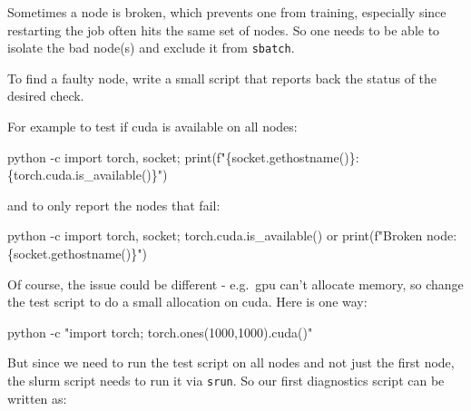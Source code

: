 \documentclass[
]{report}
\newenvironment{Shaded}{\begin{snugshade}}{\end{snugshade}}
\newcommand{\AttributeTok}[1]{\textcolor[rgb]{0.40,0.45,0.13}{#1}}
\newcommand{\ExtensionTok}[1]{\textcolor[rgb]{0.00,0.23,0.31}{#1}}
\newcommand{\NormalTok}[1]{\textcolor[rgb]{0.00,0.23,0.31}{#1}}
\newcommand{\StringTok}[1]{\textcolor[rgb]{0.13,0.47,0.30}{#1}}
\newcommand{\VariableTok}[1]{\textcolor[rgb]{0.07,0.07,0.07}{#1}}
\begin{document}
Sometimes a node is broken, which prevents one from training, especially
since restarting the job often hits the same set of nodes. So one needs
to be able to isolate the bad node(s) and exclude it from
\texttt{sbatch}.

To find a faulty node, write a small script that reports back the status
of the desired check.

For example to test if cuda is available on all nodes:

\begin{Shaded}
\begin{Highlighting}[]
\ExtensionTok{python} \AttributeTok{{-}c} \StringTok{\textquotesingle{}import torch, socket; print(f"\{socket.gethostname()\}: \{torch.cuda.is\_available()\}")\textquotesingle{}}
\end{Highlighting}
\end{Shaded}

and to only report the nodes that fail:

\begin{Shaded}
\begin{Highlighting}[]
\ExtensionTok{python} \AttributeTok{{-}c} \StringTok{\textquotesingle{}import torch, socket; torch.cuda.is\_available() or print(f"Broken node: \{socket.gethostname()\}") \textquotesingle{}}
\end{Highlighting}
\end{Shaded}

Of course, the issue could be different - e.g.~gpu can't allocate
memory, so change the test script to do a small allocation on cuda. Here
is one way:

\begin{Shaded}
\begin{Highlighting}[]
\ExtensionTok{python} \AttributeTok{{-}c} \StringTok{"import torch; torch.ones(1000,1000).cuda()"}
\end{Highlighting}
\end{Shaded}

But since we need to run the test script on all nodes and not just the
first node, the slurm script needs to run it via \texttt{srun}. So our
first diagnostics script can be written as:

\begin{Shaded}
\end{Shaded}
\end{document}

